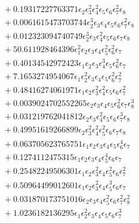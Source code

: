 \documentclass[10pt]{article}
\begin{document}
\begin{align*}
&{}  + 0.19317227763371 \epsilon_{2} \epsilon_{3}^{2} \epsilon_{4}^{2} \epsilon_{5} \epsilon_{6} \epsilon_{7}^{2} \epsilon_{8} \\
&{}  + 0.0061615473703744 \epsilon_{2}^{3} \epsilon_{3} \epsilon_{4} \epsilon_{5} \epsilon_{6} \epsilon_{7}^{2} \epsilon_{8} \\
&{}  + 0.012323094740749 \epsilon_{2}^{3} \epsilon_{3} \epsilon_{4}^{2} \epsilon_{5} \epsilon_{6} \epsilon_{7} \epsilon_{8} \\
&{}  + 50.611928464396 \epsilon_{1}^{2} \epsilon_{2} \epsilon_{3} \epsilon_{4} \epsilon_{5}^{2} \epsilon_{6}^{2} \epsilon_{7} \\
&{}  + 0.40134542972423 \epsilon_{1} \epsilon_{2} \epsilon_{3} \epsilon_{4}^{3} \epsilon_{5} \epsilon_{6}^{2} \epsilon_{7} \\
&{}  + 7.1653274954067 \epsilon_{1} \epsilon_{2}^{2} \epsilon_{3} \epsilon_{4} \epsilon_{5} \epsilon_{6}^{2} \epsilon_{7}^{2} \\
&{}  + 0.48416274061971 \epsilon_{1} \epsilon_{2} \epsilon_{3}^{2} \epsilon_{4}^{2} \epsilon_{5} \epsilon_{6} \epsilon_{7}^{2} \\
&{}  + 0.0039024702552265 \epsilon_{2} \epsilon_{3} \epsilon_{4} \epsilon_{5} \epsilon_{6}^{2} \epsilon_{7} \epsilon_{8}^{3} \\
&{}  + 0.031219762041812 \epsilon_{2} \epsilon_{3} \epsilon_{4}^{2} \epsilon_{5} \epsilon_{6} \epsilon_{7}^{3} \epsilon_{8} \\
&{}  + 0.49951619266899 \epsilon_{2} \epsilon_{3}^{2} \epsilon_{4}^{2} \epsilon_{5}^{2} \epsilon_{6} \epsilon_{7} \epsilon_{8} \\
&{}  + 0.063705623765751 \epsilon_{1} \epsilon_{2} \epsilon_{3} \epsilon_{4} \epsilon_{5} \epsilon_{6}^{4} \epsilon_{7} \\
&{}  + 0.1274112475315 \epsilon_{1} \epsilon_{2} \epsilon_{3} \epsilon_{4} \epsilon_{5}^{4} \epsilon_{6} \epsilon_{7} \\
&{}  + 0.25482249506301 \epsilon_{1} \epsilon_{2} \epsilon_{3}^{2} \epsilon_{4} \epsilon_{5}^{2} \epsilon_{6} \epsilon_{7}^{2} \\
&{}  + 0.50964499012601 \epsilon_{1} \epsilon_{2} \epsilon_{3}^{2} \epsilon_{4} \epsilon_{5}^{3} \epsilon_{6} \epsilon_{7} \\
&{}  + 0.031870173751016 \epsilon_{2} \epsilon_{3} \epsilon_{4} \epsilon_{5}^{2} \epsilon_{6} \epsilon_{7}^{2} \epsilon_{8}^{2} \\
&{}  + 1.0236182136295 \epsilon_{1} \epsilon_{2}^{2} \epsilon_{3} \epsilon_{4} \epsilon_{5} \epsilon_{6} \epsilon_{7}^{3} \\

\end{align*}
\end{document}
